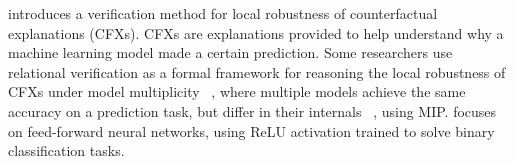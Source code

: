 \cite{CFXROBUSTNESS} introduces a verification method for local robustness of counterfactual explanations (CFXs).
 CFXs are explanations provided to help understand why a machine learning model made a certain prediction. Some researchers use relational verification as a formal framework for reasoning the local robustness of CFXs under model multiplicity  ~\cite{CFXROBUSTNESS}, where multiple models achieve the same accuracy on a prediction task, but differ in their internals ~\cite{PREDICTIVEMULTIPICITY}, using MIP. \cite{CFXROBUSTNESS} focuses on feed-forward neural networks, using ReLU activation trained to solve binary classification tasks.
